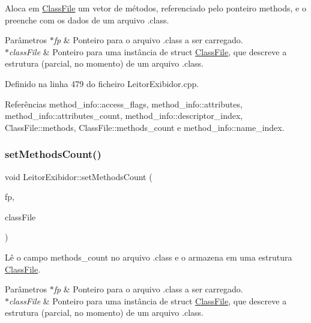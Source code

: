 Aloca em \hyperlink{classClassFile}{Class\+File} um vetor de métodos, referenciado pelo ponteiro methods, e o preenche com os dados de um arquivo .class. 
\begin{DoxyParams}{Parâmetros}
{\em $\ast$fp} & Ponteiro para o arquivo .class a ser carregado. \\
\hline
{\em $\ast$class\+File} & Ponteiro para uma instância de struct \hyperlink{classClassFile}{Class\+File}, que descreve a estrutura (parcial, no momento) de um arquivo .class. \\
\hline
\end{DoxyParams}


Definido na linha 479 do ficheiro Leitor\+Exibidor.\+cpp.



Referências method\+\_\+info\+::access\+\_\+flags, method\+\_\+info\+::attributes, method\+\_\+info\+::attributes\+\_\+count, method\+\_\+info\+::descriptor\+\_\+index, Class\+File\+::methods, Class\+File\+::methods\+\_\+count e method\+\_\+info\+::name\+\_\+index.

\mbox{\label{classLeitorExibidor_a6292517ec3beae1ef6ff67678110e961}} 
\subsubsection{\texorpdfstring{set\+Methods\+Count()}{setMethodsCount()}}
{\footnotesize\ttfamily void Leitor\+Exibidor\+::set\+Methods\+Count (\begin{DoxyParamCaption}\item[{F\+I\+LE $\ast$}]{fp,  }\item[{\hyperlink{classClassFile}{Class\+File} $\ast$}]{class\+File }\end{DoxyParamCaption})\hspace{0.3cm}{\ttfamily [private]}}

Lê o campo methods\+\_\+count no arquivo .class e o armazena em uma estrutura \hyperlink{classClassFile}{Class\+File}. 
\begin{DoxyParams}{Parâmetros}
{\em $\ast$fp} & Ponteiro para o arquivo .class a ser carregado. \\
\hline
{\em $\ast$class\+File} & Ponteiro para uma instância de struct \hyperlink{classClassFile}{Class\+File}, que descreve a estrutura (parcial, no momento) de um arquivo .class. \\
\hline
\end{DoxyParams}


